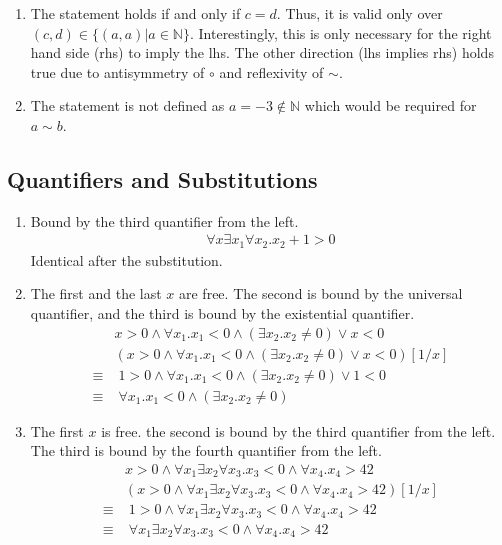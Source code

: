 \documentclass[12pt]{article}
\begin{document}
\begin{enumerate}
\begin{enumerate}
        \item The statement holds if and only if $c = d$.
        Thus, it is valid only over $(c, d) \in \{(a, a) | a \in \mathbb{N}\}$. Interestingly, this is only necessary for the right hand side (rhs) to imply the lhs. The other direction (lhs implies rhs) holds true due to antisymmetry of $\circ$ and reflexivity of $\sim$.
        \item The statement is not defined as $a = -3 \not\in \mathbb{N}$ which would be required for $a \sim b$.
    \end{enumerate}
\end{enumerate}
\subsection*{Quantifiers and Substitutions}
\begin{enumerate}
    \item Bound by the third quantifier from the left. 
    \begin{align*}
        \forall x \exists x_1 \forall x_2. x_2 + 1 > 0
    \end{align*}
    Identical after the substitution.
    \item The first and the last $x$ are free. The second is bound by the universal quantifier, and 
    the third is bound by the existential quantifier.
    \begin{align*}
        &x > 0 \land \forall x_1. x_1 < 0 \land (\exists x_2. x_2 \not= 0) \lor x < 0\\
        &(x > 0 \land \forall x_1. x_1 < 0 \land (\exists x_2. x_2 \not= 0) \lor x < 0)[1/x]\\
        \equiv&\; 1 > 0 \land \forall x_1. x_1 < 0 \land (\exists x_2. x_2 \not= 0) \lor 1 < 0\\ 
        \equiv&\;  \forall x_1. x_1 < 0 \land (\exists x_2. x_2 \not= 0)
    \end{align*}
    \item The first $x$ is free. the second is bound by the third quantifier from the left. 
    The third is bound by the fourth quantifier from the left.
    \begin{align*}
        &x > 0 \land \forall x_1 \exists x_2 \forall x_3. x_3 < 0 \land \forall x_4. x_4 > 42\\
        &(x > 0 \land \forall x_1 \exists x_2 \forall x_3. x_3 < 0 \land \forall x_4. x_4 > 42)[1/x]\\
        \equiv& \; 1 > 0 \land \forall x_1 \exists x_2 \forall x_3. x_3 < 0 \land \forall x_4. x_4 > 42 \\
        \equiv& \; \forall x_1 \exists x_2 \forall x_3. x_3 < 0 \land \forall x_4. x_4 > 42
    \end{align*}
\end{enumerate}
\end{document}
